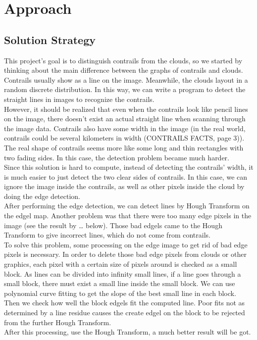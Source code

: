 \chapter{Approach}

\section{Solution Strategy} 

This project’s goal is to distinguish contrails from the clouds, so we started by thinking about the main difference between the graphs of contrails and clouds. \\
Contrails usually show as a line on the image. Meanwhile, the clouds layout in a random discrete distribution. In this way, we can write a program to detect the straight lines in images to recognize the contrails. \\
However, it should be realized that even when the contrails look like pencil lines on the image, there doesn’t exist an actual straight line when scanning through the image data. Contrails also have some width in the image (in the real world, contrails could be several kilometers in width (CONTRAILS FACTS, page 3)). The real shape of contrails seems more like some long and thin rectangles with two fading sides. In this case, the detection problem became much harder. \\
Since this solution is hard to compute, instead of detecting the contrails’ width, it is much easier to just detect the two clear sides of contrails. In this case, we can ignore the image inside the contrails, as well as other pixels inside the cloud by doing the edge detection.\\
After performing the edge detection, we can detect lines by Hough Transform on the edgel map. Another problem was that there were too many edge pixels in the image (see the result by … below). Those bad edgels came to the Hough Transform to give incorrect lines, which do not come from contrails.\\
To solve this problem, some processing on the edge image to get rid of bad edge pixels is necessary. In order to delete those bad edge pixels from clouds or other graphics, each pixel with a certain size of pixels around is checked as a small block. As lines can be divided into infinity small lines, if a line goes through a small block, there must exist a small line inside the small block. We can use polynomial curve fitting to get the slope of the best small line in each block. Then we check how well the block edgels fit the computed line. Poor fits not as determined by a line residue causes the create edgel on the block to be rejected from the further Hough Transform.\\
After this processing, use the Hough Transform, a much better result will be got.\\

